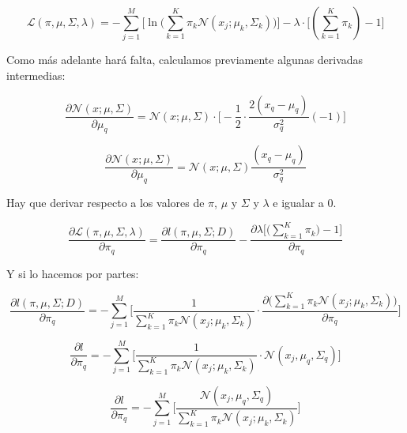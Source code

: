 \documentclass[a5paper]{article}
\begin{document}
\begin{enumerate}
\begin{equation*}
\mathcal{L}(\pi, \mu, \Sigma, \lambda) =
-\sum_{j = 1}^{M} \Bigg[ 
\ln\Big(
\sum_{k = 1}^{K} \pi_k \mathcal{N}(x_j; \mu_k, \Sigma_k)
\Big)
\Bigg] 
- \lambda \cdot \Big[(\sum_{k = 1}^{K} \pi_k) - 1\Big]
\end{equation*}

Como más adelante hará falta, calculamos previamente algunas derivadas intermedias:

\begin{equation*}
\frac{\partial \mathcal{N}(x; \mu,\Sigma)}{\partial \mu_q} = 
\mathcal{N}(x; \mu, \Sigma) \cdot
\Big[
    -\frac{1}{2} \cdot \frac{2(x_q - \mu_q)}{\sigma_q^2} (-1)
\Big]
\end{equation*}

\begin{equation}
\label{eq:1}
\frac{\partial \mathcal{N}(x; \mu,\Sigma)}{\partial \mu_q} = 
\mathcal{N}(x; \mu, \Sigma)
    \frac{(x_q - \mu_q)}{\sigma_q^2}
\end{equation}

Hay que derivar respecto a los valores de $\pi$, $\mu$ y $\Sigma$ y $\lambda$ e igualar a 0.

\begin{equation*}
\frac
{\partial \mathcal{L}(\pi,\mu, \Sigma, \lambda)}
{\partial \pi_q} = 
\frac
{\partial l(\pi, \mu, \Sigma; D)}
{\partial \pi_q}
-
\frac
{\partial \lambda
\Big[
    \Big(
        \sum_{k = 1}^{K} \pi_k
    \Big) - 1
\Big]
}
{\partial \pi_q}
\end{equation*}

Y si lo hacemos por partes:

\begin{equation*}
\frac
{\partial l(\pi, \mu, \Sigma; D)}
{\partial \pi_q} = 
-\sum_{j = 1}^{M} \Bigg[ 
\frac{1}{
\sum_{k = 1}^{K} \pi_k \mathcal{N}(x_j; \mu_k, \Sigma_k)
}
\cdot \frac{\partial \Big( 
\sum_{k = 1}^{K} \pi_k \mathcal{N}(x_j; \mu_k, \Sigma_k)
\Big)}{\partial \pi_q}
\Bigg] 
\end{equation*}

\begin{equation*}
\frac{\partial l}{\partial \pi_q} = 
-\sum_{j = 1}^{M} \Bigg[ 
\frac{1}{
\sum_{k = 1}^{K} \pi_k \mathcal{N}(x_j; \mu_k, \Sigma_k)
}
\cdot \mathcal{N}(x_j, \mu_q, \Sigma_q)
\Bigg] 
\end{equation*}


\begin{equation*}
\frac{\partial l}{\partial \pi_q} = 
-\sum_{j = 1}^{M} \Bigg[ 
\frac
{\mathcal{N}(x_j, \mu_q, \Sigma_q)}
{
\sum_{k = 1}^{K} \pi_k \mathcal{N}(x_j; \mu_k, \Sigma_k)
}
\Bigg] 
\end{equation*}


\end{enumerate}
\end{document}
